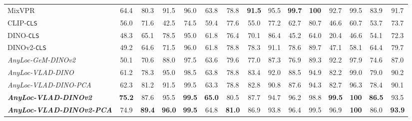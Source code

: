 \documentclass[letterpaper, 10 pt, conference]{ieeeconf}  \fi
\newcommand{\cdashmidrule}[1]{\noalign{\vskip\aboverulesep}
  \cdashline{#1}
  \noalign{\vskip\belowrulesep}}
\newcommand{\coolagg}[2]{\textit{AnyLoc-{#1}-{#2}}}
\newcommand{\dino}{\mbox{DINO}}
\newcommand{\dinovtwo}{\mbox{DINOv2}}
\begin{document}
\begin{table*}[!t]
{\begin{tabular}{@{}lcccccccccccccc@{}}
MixVPR~\cite{ali2023mixvpr}   & 64.4 & 80.3          & 91.5            & 96.0          & 63.8          & 78.8          & \textbf{91.5} & 95.5 & \textbf{99.7}          & \textbf{100} & 92.7          & 99.5          & 83.9 & 91.7 \\

\cdashmidrule{1-15}

CLIP-\texttt{CLS}~\cite{radford2021learning}  & 56.0          & 71.6          & 42.5            & 74.5          & 59.4          & 77.6 & 55.0          & 77.2         & 62.7          & 80.7        & 46.6          & 60.7        & 53.7    & 73.7          \\

\dino{}-\texttt{CLS}~\cite{caron2021emerging} & 48.3 & 65.1 & 78.5 & 95.0 & 61.8 & 76.4 & 70.1 & 86.4 & 45.2 & 64.0 & 20.4 & 46.6 & 54.1 & 72.3 \\

\dinovtwo{}-\texttt{CLS}~\cite{oquab2023dinov2} & 49.2 & 64.6 & 71.5 & 96.0 & 61.8 & 78.8 & 78.3 & 91.1 & 78.6 & 89.7 & 47.1 & 58.1 & 64.4 & 79.7 \\



\rowcolor{Light}
\coolagg{GeM}{\dinovtwo{}} & 50.1 & 70.6 & 88.0 & 97.5 & 63.6 & 79.6 & 77.0 & 87.3 & 76.9 & 89.3 & 92.2 & 97.9 & 74.6 & 87.0
\\


\rowcolor{Light}
\coolagg{VLAD}{\dino{}} & 61.2 & 78.3 & 95.0 & 98.5 & 63.8 & 78.8 & 83.4 & 92.0 & 88.5 & 94.9 & 82.2 & 99.0 & 79.0 & 90.2
\\

\rowcolor{Light}
\coolagg{VLAD}{\dino{}}\textit{-PCA} & 62.3 & 81.2 & 91.5 & 99.5 & 63.3 & 78.8 & 82.8 & 90.8 & 87.6 & 94.3 & 82.7 & 96.3 & 78.4 & 90.1
\\



\rowcolor{Light}
\textbf{\coolagg{VLAD}{\dinovtwo{}}}   & \textbf{75.2}  & 87.6 & 95.5 & \textbf{99.5} & \textbf{65.0} & 80.5 & 87.7 & 94.7 & 96.2 & 98.8 & \textbf{99.5} & \textbf{100} & \textbf{86.5} & 93.5
\\

\rowcolor{Light}
\textbf{\coolagg{VLAD}{\dinovtwo{}}\textit{-PCA}}   & 74.9  & \textbf{89.4} & \textbf{96.0} & \textbf{99.5} & 64.8 & \textbf{81.0} & 86.9 & 93.8 & 96.4 & 99.5 & 96.9 & \textbf{100} & 86.0 & \textbf{93.9}
\\

\bottomrule
\end{tabular}
}
\label{tab:mainResult}
\end{table*} 
\end{document}
